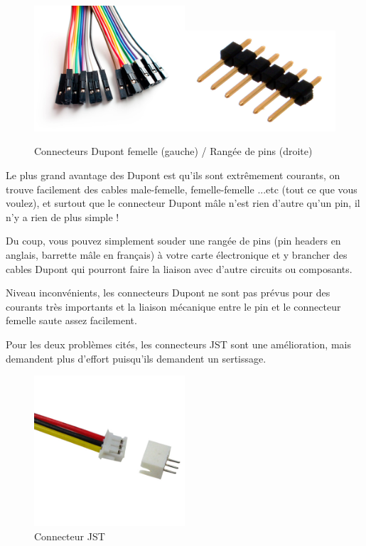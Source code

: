 \documentclass[a4paper, 11pt]{report}
\begin{document}
\begin{figure}[h]
\caption{Connecteurs Dupont femelle (gauche) / Rangée de pins (droite)}

\centering{}\includegraphics[width=0.5\textwidth]{images/dupont_femelle.jpg}\includegraphics[width=0.5\textwidth]{images/pin_header.jpg}
\end{figure}

Le plus grand avantage des Dupont est qu'ils sont extrêmement courants,
on trouve facilement des cables male-femelle, femelle-femelle ...etc
(tout ce que vous voulez), et surtout que le connecteur Dupont mâle
n'est rien d'autre qu'un pin, il n'y a rien de plus simple !

Du coup, vous pouvez simplement souder une rangée de pins (pin headers
en anglais, barrette mâle en français) à votre carte électronique
et y brancher des cables Dupont qui pourront faire la liaison avec
d'autre circuits ou composants.

Niveau inconvénients, les connecteurs Dupont ne sont pas prévus pour
des courants très importants et la liaison mécanique entre le pin
et le connecteur femelle saute assez facilement.

Pour les deux problèmes cités, les connecteurs JST sont une amélioration,
mais demandent plus d'effort puisqu'ils demandent un sertissage.

\begin{figure}[h]
\caption{Connecteur JST}

\centering{}\includegraphics[width=0.5\textwidth]{images/jst}
\end{figure}
\end{document}
